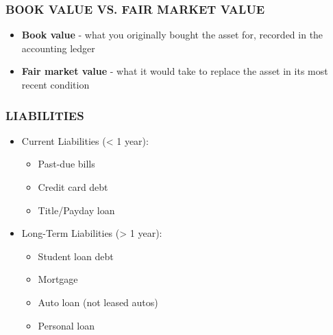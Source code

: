 \documentclass[12pt]{article}
\begin{document}
            \subsubsection{BOOK VALUE VS. FAIR MARKET VALUE}
                \begin{itemize}
                    \item \textbf{Book value} - what you originally bought the asset for, recorded in the accounting ledger
                    \item \textbf{Fair market value} - what it would take to replace the asset in its most recent condition
                \end{itemize}
            \subsubsection{LIABILITIES}
                \begin{itemize}
                    \item Current Liabilities (< 1 year):
                        \begin{itemize}
                            \item Past-due bills
                            \item Credit card debt
                            \item Title/Payday loan
                        \end{itemize}
                    \item Long-Term Liabilities (> 1 year):
                        \begin{itemize}
                            \item Student loan debt
                            \item Mortgage
                            \item Auto loan (not leased autos)
                            \item Personal loan
                        \end{itemize}
                \end{itemize}
\end{document}
